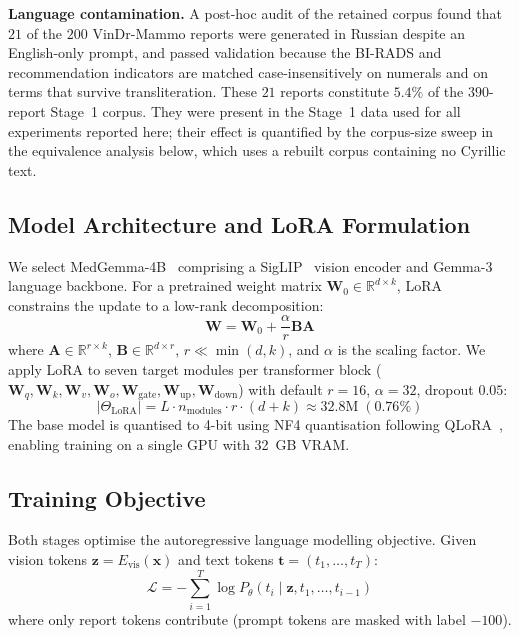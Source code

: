 \documentclass{wlscirep}
\begin{document}
\textbf{Language contamination.} A post-hoc audit of the retained corpus found that $21$ of the $200$ VinDr-Mammo reports were generated in Russian despite an English-only prompt, and passed validation because the BI-RADS and recommendation indicators are matched case-insensitively on numerals and on terms that survive transliteration. These $21$ reports constitute $5.4\%$ of the $390$-report Stage~1 corpus. They were present in the Stage~1 data used for all experiments reported here; their effect is quantified by the corpus-size sweep in the equivalence analysis below, which uses a rebuilt corpus containing no Cyrillic text.

\subsection*{Model Architecture and LoRA Formulation}

We select MedGemma-4B~\cite{lin2024medgemma} comprising a SigLIP~\cite{zoph2020siglip} vision encoder and Gemma-3 language backbone. For a pretrained weight matrix $\mathbf{W}_0 \in \mathbb{R}^{d \times k}$, LoRA~\cite{hu2022lora} constrains the update to a low-rank decomposition:
\begin{equation}
\mathbf{W} = \mathbf{W}_0 + \frac{\alpha}{r}\mathbf{B}\mathbf{A}
\label{eq:lora}
\end{equation}
where $\mathbf{A} \in \mathbb{R}^{r \times k}$, $\mathbf{B} \in \mathbb{R}^{d \times r}$, $r \ll \min(d,k)$, and $\alpha$ is the scaling factor. We apply LoRA to seven target modules per transformer block ($\mathbf{W}_q, \mathbf{W}_k, \mathbf{W}_v, \mathbf{W}_o, \mathbf{W}_{\text{gate}}, \mathbf{W}_{\text{up}}, \mathbf{W}_{\text{down}}$) with default $r=16$, $\alpha=32$, dropout $0.05$:
\begin{equation}
|\Theta_{\text{LoRA}}| = L \cdot n_{\text{modules}} \cdot r \cdot (d + k) \approx 32.8\text{M} \;(0.76\%)
\end{equation}
The base model is quantised to 4-bit using NF4 quantisation following QLoRA~\cite{dettmers2024qlora, dettmers2022gptint8}, enabling training on a single GPU with 32~GB VRAM.

\subsection*{Training Objective}

Both stages optimise the autoregressive language modelling objective. Given vision tokens $\mathbf{z} = E_{\text{vis}}(\mathbf{x})$ and text tokens $\mathbf{t} = (t_1, \ldots, t_T)$:
\begin{equation}
\mathcal{L} = -\sum_{i=1}^{T} \log P_\theta(t_i \mid \mathbf{z}, t_1, \ldots, t_{i-1})
\label{eq:loss}
\end{equation}
where only report tokens contribute (prompt tokens are masked with label $-100$).
\end{document}
